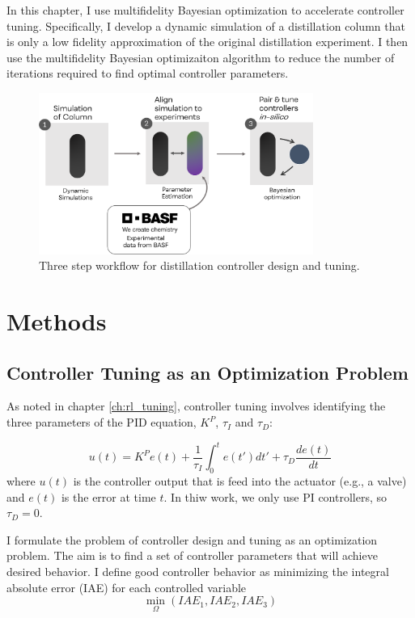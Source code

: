 In this chapter, I use multifidelity Bayesian optimization to accelerate controller tuning. Specifically, I develop a dynamic simulation of a distillation column that is only a low fidelity approximation of the original distillation experiment. I then use the multifidelity Bayesian optimizaiton algorithm to reduce the number of iterations required to find optimal controller parameters. 

\begin{figure}
    \centering
    \includegraphics[width=0.8\textwidth]{gfx/Chapter06/tuning_workflow.png}
    \caption{Three step workflow for distillation controller design and tuning. }
    \label{fig:tuning_workflow}
\end{figure}

\section{Methods}

\subsection{Controller Tuning as an Optimization Problem}

As noted in chapter \ref{ch:rl_tuning}, controller tuning involves identifying the three parameters of the PID equation, $K^P$, $\tau_I$ and $\tau_D$:

\begin{equation}
    \label{eq:PID_defining_equation}
    u(t) = K^P e(t) + \frac{1}{\tau_I}\int_0^t e(t')dt' + \tau_D \frac{de(t)}{dt}
\end{equation}
where $u(t)$ is the controller output that is feed into the actuator (e.g., a valve) and $e(t)$ is the error at time $t$. In thiw work, we only use PI controllers, so $\tau_D=0$.

I formulate the problem of controller design and tuning as an optimization problem. The aim is to find a set of controller parameters that will achieve desired behavior. I define good controller behavior as minimizing the integral absolute error (IAE) for each controlled variable
\begin{equation}
    \min_{\Omega}(IAE_1, IAE_2, IAE_3)
\end{equation}


